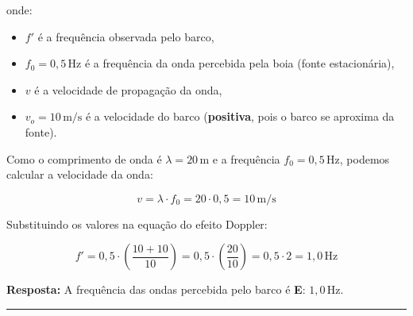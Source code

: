 \documentclass[a4paper,12pt]{article}
\begin{document}
\begin{flushleft}
\noindent
onde:
\begin{itemize}
  \item \( f' \) é a frequência observada pelo barco,
  \item \( f_0 = 0{,}5\,\text{Hz} \) é a frequência da onda percebida pela boia (fonte estacionária),
  \item \( v \) é a velocidade de propagação da onda,
  \item \( v_o = 10\,\text{m/s} \) é a velocidade do barco (\textbf{positiva}, pois o barco se aproxima da fonte).
\end{itemize}

\noindent
Como o comprimento de onda é \( \lambda = 20\,\text{m} \) e a frequência \( f_0 = 0{,}5\,\text{Hz} \), podemos calcular a velocidade da onda:

\begin{equation}
v = \lambda \cdot f_0 = 20 \cdot 0{,}5 = 10\,\text{m/s}
\end{equation}

\noindent
Substituindo os valores na equação do efeito Doppler:

\begin{equation}
f' = 0{,}5 \cdot \left( \frac{10 + 10}{10} \right) = 0{,}5 \cdot \left( \frac{20}{10} \right) = 0{,}5 \cdot 2 = 1{,}0\,\text{Hz}
\end{equation}

\noindent
\textbf{Resposta:} A frequência das ondas percebida pelo barco é \colorbox{green!50}{\textbf{E}}: \( \boxed{1{,}0\,\text{Hz}} \).

\end{flushleft}

\noindent\rule{\linewidth}{0.6pt}\\
\end{document}
